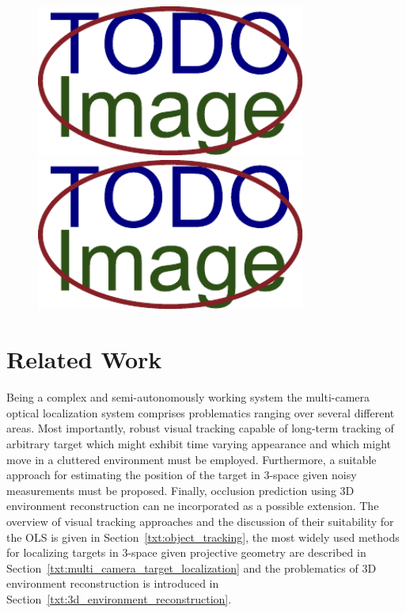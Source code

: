 \begin{figure}[t]\centering %
	\centering
	\includegraphics[width=0.45\linewidth, height=5cm]{fig/placeholder.pdf}
	\includegraphics[width=0.45\linewidth, height=5cm]{fig/placeholder.pdf}
	\caption{}
	\label{fig:WidePicture}
\end{figure}

\vata[4]

\chapter{Related Work}

Being a complex and semi-autonomously working system the multi-camera optical localization system comprises problematics ranging over several different areas. Most importantly, robust visual tracking capable of long-term tracking of arbitrary target which might exhibit time varying appearance and which might move in a cluttered environment must be employed. Furthermore, a suitable approach for estimating the position of the target in 3-space given noisy measurements must be proposed. Finally, occlusion prediction using 3D environment reconstruction can ne incorporated as a possible extension. The overview of visual tracking approaches and the discussion of their suitability for the OLS is given in Section~\ref{txt:object_tracking}, the most widely used methods for localizing targets in 3-space given projective geometry are described in Section~\ref{txt:multi_camera_target_localization} and the problematics of 3D environment reconstruction is introduced in Section~\ref{txt:3d_environment_reconstruction}.

